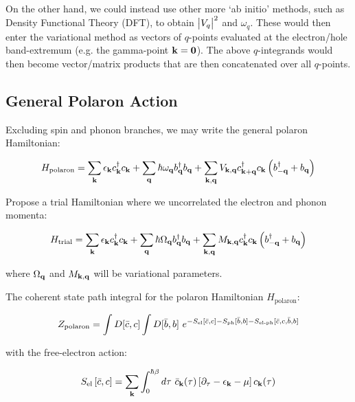 On the other hand, we could instead use other more `ab initio' methods, such as Density Functional Theory (DFT), to obtain $\abs{V_q}^2$ and $\omega_q$. These would then enter the variational method as vectors of $q$-points evaluated at the electron/hole band-extremum (e.g. the gamma-point $\vb{k} = \vb{0}$). The above $q$-integrands would then become vector/matrix products that are then concatenated over all $q$-points.

\subsection{General Polaron Action}

Excluding spin and phonon branches, we may write the general polaron Hamiltonian:

\begin{equation}
    H_{\text{polaron}} = \sum_{\vb{k}} \epsilon_{\vb{k}} c^\dagger_{\vb{k}} c_{\vb{k}} + \sum_{\vb{q}} \hbar \omega_{\vb{q}} b^\dagger_{\vb{q}} b_{\vb{q}} + \sum_{\vb{k}, \vb{q}} V_{\vb{k},\vb{q}} c^\dagger_{\vb{k}+\vb{q}}c_{\vb{k}} \left( b^\dagger_{-\vb{q}} + b_{\vb{q}} \right)
\end{equation}

Propose a trial Hamiltonian where we uncorrelated the electron and phonon momenta:

\begin{equation}
    H_{\text{trial}} = \sum_{\vb{k}} \epsilon_{\vb{k}} c^\dagger_{\vb{k}} c_{\vb{k}} + \sum_{\vb{q}} \hbar \Omega_{\vb{q}} b^\dagger_{\vb{q}} b_{\vb{q}} + \sum_{\vb{k}, \vb{q}} M_{\vb{k},\vb{q}} c^\dagger_{\vb{k}}c_{\vb{k}} \left( b^\dagger_{-\vb{q}} + b_{\vb{q}} \right)
\end{equation}

where $\Omega_{\vb{q}}$ and $M_{\vb{k}, \vb{q}}$ will be variational parameters.

The coherent state path integral for the polaron Hamiltonian $H_{\text{polaron}}$:

\begin{equation}
    Z_{\text{polaron}} = \int D[\Bar{c}, c] \int D[\Bar{b},b]\ e^{-S_{\text{el}}[\Bar{c}, c] - S_{\text{ph}}[\Bar{b},b] - S_{\text{el-ph}}[\Bar{c},c,\Bar{b},b]}
\end{equation}

with the free-electron action:

\begin{equation}
        S_{\text{el}}\left[\Bar{c}, c\right] =  \sum_{\vb{k}} \int_0^{\hbar\beta} d\tau\ \Bar{c}_{\vb{k}}(\tau) \left[\partial_{\tau} - \epsilon_{\vb{k}} - \mu \right] c_{\vb{k}}(\tau)
\end{equation}

